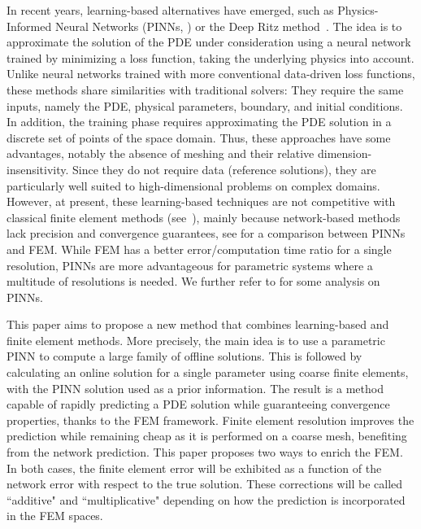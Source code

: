 In recent years, learning-based alternatives have emerged, such as Physics-Informed Neural Networks (PINNs, \cite{RAISSI2019686})
or the Deep Ritz method~\cite{e2017deepritzmethoddeep}.
The idea is to approximate the solution of the PDE under consideration using a neural network trained by minimizing a loss function,
taking the underlying physics into account.
Unlike neural networks trained with more conventional data-driven loss functions, these methods share similarities with traditional
solvers: They require the same inputs, namely the PDE, physical parameters, boundary, and initial conditions.
In addition, the training phase requires approximating the PDE solution in a discrete set of points of the space domain.
Thus, these approaches have some advantages, notably the absence of meshing and their relative dimension-insensitivity.
Since they do not require data (reference solutions), they are particularly well suited to high-dimensional problems on complex domains.
However, at present, these learning-based techniques are not competitive with classical finite element methods (see~\cite{grossmann2023can}), mainly because network-based methods lack precision and convergence guarantees, see \cite{sikora2024comparison} for a comparison between PINNs and FEM.
While FEM has a better error/computation time ratio for a single resolution, PINNs are more advantageous for parametric systems where a multitude of resolutions is needed. We further refer to \cite{cuomo2022scientific} for some analysis on PINNs.


This paper aims to propose a new method that combines learning-based and finite element methods.
More precisely, the main idea is to use a parametric PINN to compute a large family of offline solutions.
This is followed by calculating an online solution for a single parameter using coarse finite elements, with the PINN solution used as a prior information.
The result is a method capable of rapidly predicting a PDE solution while guaranteeing convergence properties, thanks to the FEM framework.
Finite element resolution improves the prediction while remaining cheap as it is performed on a coarse mesh, benefiting from the network prediction.
This paper proposes two ways to enrich the FEM.
In both cases, the finite element error will be exhibited as a function of the network error with respect to the true solution.
These corrections will be called ``additive" and ``multiplicative" depending on how the prediction is incorporated in the FEM spaces.



